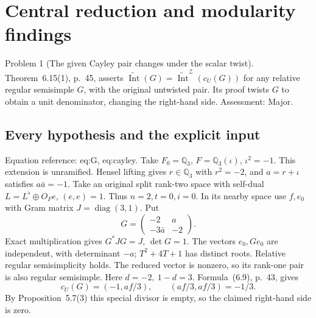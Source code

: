 \documentclass[10pt]{article}
\begin{document}
\section*{Central reduction and modularity findings}
Problem 1 (The given Cayley pair changes under the scalar twist).  Theorem 6.15(1), p. 45, asserts \(\widetilde{\operatorname{Int}}(G)=\widetilde{\operatorname{Int}}^{\mathcal Z}(c_U(G))\) for any relative regular semisimple \(G\), with the original untwisted pair. Its proof twists \(G\) to obtain a unit denominator, changing the right-hand side. Assessment: Major.\par
\subsection*{Every hypothesis and the explicit input}
Equation reference: eq:G, eq:cayley. Take \(F_0=\mathbb Q_3\), \(F=\mathbb Q_3(\iota)\), \(\iota^2=-1\). This extension is unramified. Hensel lifting gives \(r\in\mathbb Q_3\) with \(r^2=-2\), and \(a=r+\iota\) satisfies \(a\bar a=-1\). Take an original split rank-two space with self-dual \(L=L^\flat\oplus O_Fe\), \((e,e)=1\). Thus \(n=2,t=0,i=0\). In its nearby space use \(f,e_0\) with Gram matrix \(J=\operatorname{diag}(3,1)\). Put \[
 G=\begin{pmatrix}-2&a\\-3\bar a&-2\end{pmatrix}.\] Exact multiplication gives \(G^*JG=J\), \(\det G=1\). The vectors \(e_0,Ge_0\) are independent, with determinant \(-a\); \(T^2+4T+1\) has distinct roots. Relative regular semisimplicity holds. The reduced vector is nonzero, so its rank-one pair is also regular semisimple. Here \(d=-2,\ 1-d=3\). Formula (6.9), p. 43, gives \[
 c_U(G)=(-1,af/3),\qquad (af/3,af/3)=-1/3.\] By Proposition 5.7(3) this special divisor is empty, so the claimed right-hand side is zero.\par
\end{document}
